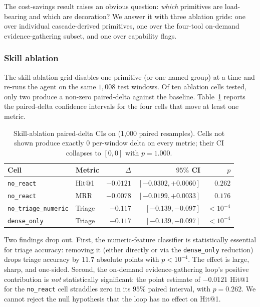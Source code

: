 The cost-savings result raises an obvious question: \emph{which} primitives are load-bearing and which are decoration? We answer it with three ablation grids: one over individual cascade-derived primitives, one over the four-tool on-demand evidence-gathering subset, and one over capability flags.

\subsubsection{Skill ablation}

The skill-ablation grid disables one primitive (or one named group) at a time and re-runs the agent on the same $1{,}008$ test windows. Of ten ablation cells tested, only two produce a non-zero paired-delta against the baseline. Table~\ref{tab:skill-paired} reports the paired-delta confidence intervals for the four cells that move at least one metric.

\begin{table}[ht]
  \centering
  \caption{Skill-ablation paired-delta CIs on \dsob{} (1{,}000 paired resamples). Cells not shown produce exactly $0$ per-window delta on every metric; their CI collapses to $[0, 0]$ with $p=1.000$.}
  \label{tab:skill-paired}
  \small
  \begin{tabular}{llrrr}
    \toprule
    Cell & Metric & $\Delta$ & $95\%$ CI & $p$ \\
    \midrule
    \texttt{no\_react}           & Hit@1     & $-0.0121$ & $[-0.0302, +0.0060]$ & $0.262$ \\
    \texttt{no\_react}           & MRR       & $-0.0078$ & $[-0.0199, +0.0033]$ & $0.176$ \\
    \texttt{no\_triage\_numeric} & Triage    & $-0.117$  & $[-0.139, -0.097]$   & $<10^{-4}$ \\
    \texttt{dense\_only}         & Triage    & $-0.117$  & $[-0.139, -0.097]$   & $<10^{-4}$ \\
    \bottomrule
  \end{tabular}
\end{table}

Two findings drop out. First, the numeric-feature classifier is statistically essential for triage accuracy: removing it (either directly or via the \texttt{dense\_only} reduction) drops triage accuracy by $11.7$ absolute points with $p < 10^{-4}$. The effect is large, sharp, and one-sided. Second, the on-demand evidence-gathering loop's positive contribution is \emph{not} statistically significant: the point estimate of $-0.0121$ Hit@1 for the \texttt{no\_react} cell straddles zero in its $95\%$ paired interval, with $p = 0.262$. We cannot reject the null hypothesis that the loop has no effect on Hit@1.

